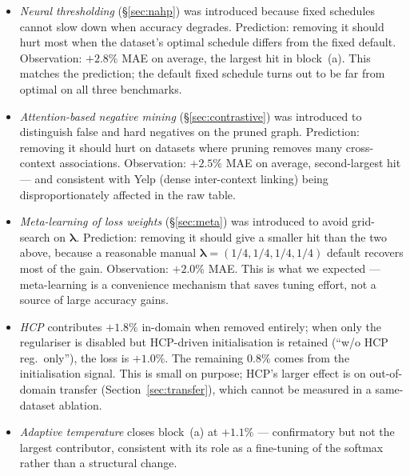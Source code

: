 \documentclass[10pt]{article}
\theoremstyle{plain}
\theoremstyle{definition}
\begin{document}
\begin{itemize}[leftmargin=*,itemsep=1pt]
\item \emph{Neural thresholding} (\S\ref{sec:nahp}) was introduced because fixed schedules cannot slow down when accuracy degrades. Prediction: removing it should hurt most when the dataset's optimal schedule differs from the fixed default. Observation: $+2.8\%$ MAE on average, the largest hit in block~(a). This matches the prediction; the default fixed schedule turns out to be far from optimal on all three benchmarks.
\item \emph{Attention-based negative mining} (\S\ref{sec:contrastive}) was introduced to distinguish false and hard negatives on the pruned graph. Prediction: removing it should hurt on datasets where pruning removes many cross-context associations. Observation: $+2.5\%$ MAE on average, second-largest hit --- and consistent with Yelp (dense inter-context linking) being disproportionately affected in the raw table.
\item \emph{Meta-learning of loss weights} (\S\ref{sec:meta}) was introduced to avoid grid-search on $\boldsymbol{\lambda}$. Prediction: removing it should give a smaller hit than the two above, because a reasonable manual $\boldsymbol{\lambda}=(1/4,1/4,1/4,1/4)$ default recovers most of the gain. Observation: $+2.0\%$ MAE. This is what we expected --- meta-learning is a convenience mechanism that saves tuning effort, not a source of large accuracy gains.
\item \emph{HCP} contributes $+1.8\%$ in-domain when removed entirely; when only the regulariser is disabled but HCP-driven initialisation is retained (``w/o HCP reg.\ only''), the loss is $+1.0\%$. The remaining $0.8\%$ comes from the initialisation signal. This is small on purpose; HCP's larger effect is on out-of-domain transfer (Section~\ref{sec:transfer}), which cannot be measured in a same-dataset ablation.
\item \emph{Adaptive temperature} closes block~(a) at $+1.1\%$ --- confirmatory but not the largest contributor, consistent with its role as a fine-tuning of the softmax rather than a structural change.
\end{itemize}
\end{document}
